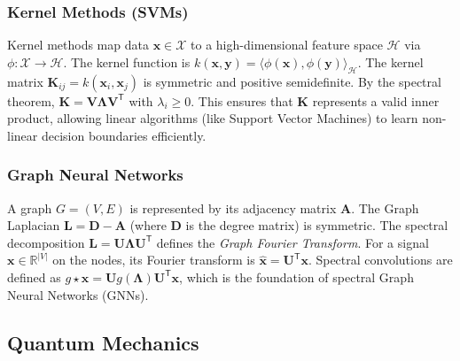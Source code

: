 \begin{center}
\end{center}

\subsubsection{Kernel Methods (SVMs)}
Kernel methods map data $\mathbf{x} \in \mathcal{X}$ to a high-dimensional feature space $\mathcal{H}$ via $\phi: \mathcal{X} \to \mathcal{H}$. The kernel function is $k(\mathbf{x}, \mathbf{y}) = \langle \phi(\mathbf{x}), \phi(\mathbf{y}) \rangle_{\mathcal{H}}$.
The kernel matrix $\mathbf{K}_{ij} = k(\mathbf{x}_i, \mathbf{x}_j)$ is symmetric and positive semidefinite.
By the spectral theorem, $\mathbf{K} = \mathbf{V}\mathbf{\Lambda}\mathbf{V}^{\mathsf{T}}$ with $\lambda_i \ge 0$. This ensures that $\mathbf{K}$ represents a valid inner product, allowing linear algorithms (like Support Vector Machines) to learn non-linear decision boundaries efficiently.

\subsubsection{Graph Neural Networks}
A graph $G=(V,E)$ is represented by its adjacency matrix $\mathbf{A}$. The Graph Laplacian $\mathbf{L} = \mathbf{D} - \mathbf{A}$ (where $\mathbf{D}$ is the degree matrix) is symmetric.
The spectral decomposition $\mathbf{L} = \mathbf{U}\mathbf{\Lambda}\mathbf{U}^{\mathsf{T}}$ defines the \emph{Graph Fourier Transform}.
For a signal $\mathbf{x} \in \mathbb{R}^{|V|}$ on the nodes, its Fourier transform is $\hat{\mathbf{x}} = \mathbf{U}^{\mathsf{T}}\mathbf{x}$.
Spectral convolutions are defined as $g \star \mathbf{x} = \mathbf{U} g(\mathbf{\Lambda}) \mathbf{U}^{\mathsf{T}} \mathbf{x}$, which is the foundation of spectral Graph Neural Networks (GNNs).

\subsection{Quantum Mechanics}

